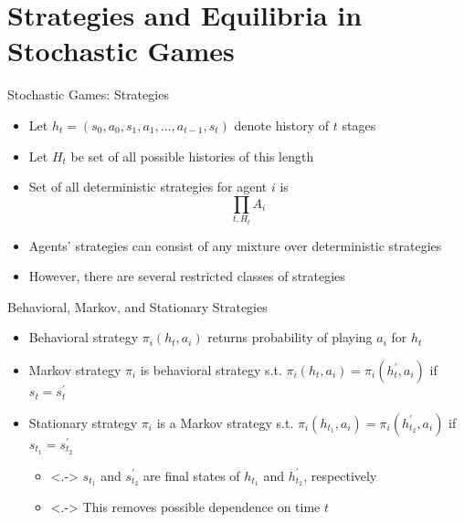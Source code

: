 \documentclass[11pt,aspectratio=169,handout]{beamer}
\begin{document}
  
 \section{Strategies and Equilibria in Stochastic Games}
 
  \begin{frame}{Stochastic Games: Strategies}
   \begin{itemize}
    \item Let $h_t =(s_0, a_0, s_1, a_1, \dots, a_{t-1}, s_t)$ denote \alert{history} of $t$ stages
    \item Let $H_t$ be set of all possible histories of this length
    \item Set of all \alert{deterministic} strategies for agent $i$ is
    $$\prod_{t,H_t}A_i$$
    \item Agents' strategies can consist of any mixture over deterministic strategies
    \item However, there are several restricted classes of strategies
   \end{itemize}
  \end{frame}
  
  
  \begin{frame}{Behavioral, Markov, and Stationary Strategies}
   \begin{itemize}[<+->]
   \setlength{\itemsep}{1.2em}
    \item \alert{Behavioral} strategy $\pi_i(h_t, a_{i})$ returns probability of playing $a_i$ for $h_t$
    \item \alert{Markov} strategy $\pi_i$ is behavioral strategy s.t. $\pi_i(h_t,a_i) = \pi_i(h^\prime_t,a_i)$ if $s_t = s_t^\prime$
    \item \alert{Stationary} strategy $\pi_i$ is a Markov strategy s.t. $\pi_i(h_{t_1}, a_i) = \pi_i(h^\prime_{t_2}, a_i)$ if $s_{t_1} = s^\prime_{t_2}$
    \vspace{0.5em}
    \begin{itemize}
    \setlength{\itemsep}{0.5em}
     \item<.-> $s_{t_1}$ and $s^\prime_{t_2}$ are final states of $h_{t_1}$ and $h^\prime_{t_2}$, respectively
     \item<.-> This removes possible dependence on time $t$
    \end{itemize}
   \end{itemize}
  \end{frame}
  
\end{document}
